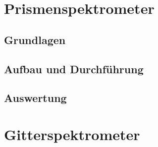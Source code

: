 \documentclass[12pt,a4paper]{article}
\author{Tim}
\begin{document}
\tableofcontents


\section{Prismenspektrometer}

\subsection{Grundlagen}

\subsection{Aufbau und Durchführung}

\subsection{Auswertung}






\section{Gitterspektrometer}
\end{document}
